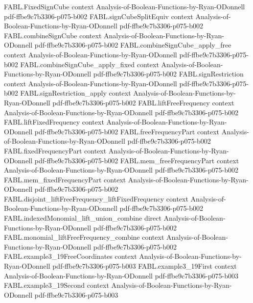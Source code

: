\begin{theorem}
\proofstep
  {FABL.FixedSignCube}
  {context}
  {Analysis-of-Boolean-Functions-by-Ryan-ODonnell}
  {pdf-ffbe9c7b3306-p075-b002}
\proofstep
  {FABL.signCubeSplitEquiv}
  {context}
  {Analysis-of-Boolean-Functions-by-Ryan-ODonnell}
  {pdf-ffbe9c7b3306-p075-b002}
\proofstep
  {FABL.combineSignCube}
  {context}
  {Analysis-of-Boolean-Functions-by-Ryan-ODonnell}
  {pdf-ffbe9c7b3306-p075-b002}
\proofstep
  {FABL.combineSignCube_apply_free}
  {context}
  {Analysis-of-Boolean-Functions-by-Ryan-ODonnell}
  {pdf-ffbe9c7b3306-p075-b002}
\proofstep
  {FABL.combineSignCube_apply_fixed}
  {context}
  {Analysis-of-Boolean-Functions-by-Ryan-ODonnell}
  {pdf-ffbe9c7b3306-p075-b002}
\proofstep
  {FABL.signRestriction}
  {context}
  {Analysis-of-Boolean-Functions-by-Ryan-ODonnell}
  {pdf-ffbe9c7b3306-p075-b002}
\proofstep
  {FABL.signRestriction_apply}
  {context}
  {Analysis-of-Boolean-Functions-by-Ryan-ODonnell}
  {pdf-ffbe9c7b3306-p075-b002}
\proofstep
  {FABL.liftFreeFrequency}
  {context}
  {Analysis-of-Boolean-Functions-by-Ryan-ODonnell}
  {pdf-ffbe9c7b3306-p075-b002}
\proofstep
  {FABL.liftFixedFrequency}
  {context}
  {Analysis-of-Boolean-Functions-by-Ryan-ODonnell}
  {pdf-ffbe9c7b3306-p075-b002}
\proofstep
  {FABL.freeFrequencyPart}
  {context}
  {Analysis-of-Boolean-Functions-by-Ryan-ODonnell}
  {pdf-ffbe9c7b3306-p075-b002}
\proofstep
  {FABL.fixedFrequencyPart}
  {context}
  {Analysis-of-Boolean-Functions-by-Ryan-ODonnell}
  {pdf-ffbe9c7b3306-p075-b002}
\proofstep
  {FABL.mem_freeFrequencyPart}
  {context}
  {Analysis-of-Boolean-Functions-by-Ryan-ODonnell}
  {pdf-ffbe9c7b3306-p075-b002}
\proofstep
  {FABL.mem_fixedFrequencyPart}
  {context}
  {Analysis-of-Boolean-Functions-by-Ryan-ODonnell}
  {pdf-ffbe9c7b3306-p075-b002}
\proofstep
  {FABL.disjoint_liftFreeFrequency_liftFixedFrequency}
  {context}
  {Analysis-of-Boolean-Functions-by-Ryan-ODonnell}
  {pdf-ffbe9c7b3306-p075-b002}
\proofstep
  {FABL.indexedMonomial_lift_union_combine}
  {direct}
  {Analysis-of-Boolean-Functions-by-Ryan-ODonnell}
  {pdf-ffbe9c7b3306-p075-b002}
\proofstep
  {FABL.monomial_liftFreeFrequency_combine}
  {context}
  {Analysis-of-Boolean-Functions-by-Ryan-ODonnell}
  {pdf-ffbe9c7b3306-p075-b002}
\proofstep
  {FABL.example3_19FreeCoordinates}
  {context}
  {Analysis-of-Boolean-Functions-by-Ryan-ODonnell}
  {pdf-ffbe9c7b3306-p075-b003}
\proofstep
  {FABL.example3_19First}
  {context}
  {Analysis-of-Boolean-Functions-by-Ryan-ODonnell}
  {pdf-ffbe9c7b3306-p075-b003}
\proofstep
  {FABL.example3_19Second}
  {context}
  {Analysis-of-Boolean-Functions-by-Ryan-ODonnell}
  {pdf-ffbe9c7b3306-p075-b003}

\end{theorem}
